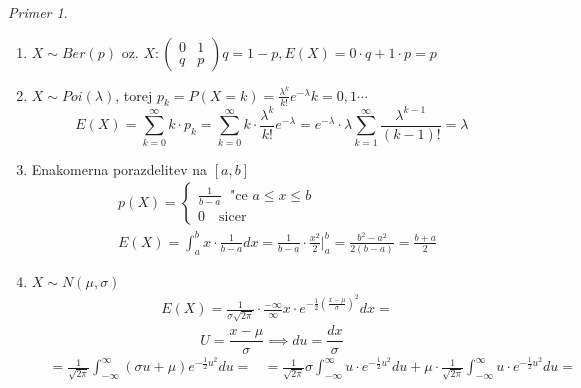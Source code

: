 \documentclass[a4paper,12pt]{article}
\theoremstyle{definition}
\theoremstyle{remark}
\newtheorem*{ex}{Primer}
\begin{document}
\begin{ex} \text{} \\
    \begin{enumerate}
        \item $X \sim Ber(p)$ oz. $X: \begin{pmatrix}0 & 1 \\ q & p
            \end{pmatrix} q = 1-p, E(X) = 0 \cdot q + 1 \cdot p = p$
        \item $X \sim Poi(\lambda)$, torej $p_k = P(X=k) = \frac{\lambda^k}{k!} e^{-\lambda} k = 0, 1 \cdots$
            \begin{equation*}
                E(X) = \sum_{k=0}^{\infty} k \cdot p_k = \sum_{k=0}^{\infty} k \cdot \frac{\lambda^k}{k!} e^{-\lambda} =
                e^{-\lambda} \cdot \lambda \sum_{k=1}^{\infty} \frac{\lambda^{k-1}}{(k-1)!} = \lambda
            \end{equation*}
        \item Enakomerna porazdelitev na $[a,b]$
            \begin{align*}
                &p(X) = \begin{cases}
                    \frac{1}{b-a} \; \text{ "ce } a \leq x \leq b \\
                    0 \quad \text{sicer}
                \end{cases} \\
                &E(X) = \int_{a}^{b} x \cdot \frac{1}{b-a} dx = \frac{1}{b-a} \cdot \frac{x^2}{2} \vert_{a}^b =
                    \frac{b^2 - a^2}{2(b-a)} = \frac{b+a}{2}
            \end{align*}
        \item $X \sim N(\mu, \sigma)$ %
            \begin{align*}
                &E(X) = \frac{1}{\sigma \sqrt{2\pi}} \cdot \frac{-\infty}{\infty} x \cdot
                e^{-\frac{1}{2} (\frac{x-\mu}{\sigma})^2} dx =
            \end{align*}
            \begin{equation*}
                U = \frac{x - \mu}{\sigma} \implies du = \frac{dx}{\sigma}
            \end{equation*}
            \begin{align}
                &= \frac{1}{\sqrt{2\pi}} \int_{-\infty}^{\infty} (\sigma u + \mu) e^{-\frac{1}{2} u^2} du =
                &= \frac{1}{\sqrt{2\pi}} \sigma \int_{-\infty}^{\infty} u \cdot e^{-\frac{1}{2} u^2} du +
                    \mu \cdot \frac{1}{\sqrt{2\pi}} \int_{-\infty}^{\infty} u \cdot e^{-\frac{1}{2} u^2} du =

\end{align}
\end{enumerate}
\end{ex}
\end{document}
